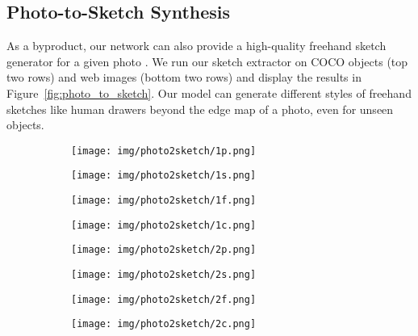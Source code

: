 \documentclass[10pt,twocolumn,letterpaper]{article}
\begin{document}
\subsection{Photo-to-Sketch Synthesis}
\label{sec:p2s_syn}
As a byproduct, our network can also provide a high-quality freehand sketch generator  for a given photo \cite{pang2018deep,yi2019apdrawinggan,kampelmuhler2020synthesizing}. We run our sketch extractor on COCO objects (top two rows) and web images (bottom two rows) and display the results in Figure~\ref{fig:photo_to_sketch}. Our model can generate different styles of freehand sketches like human drawers beyond the edge map of a photo, even for unseen objects.

\newcommand{\ptswidth}{0.22} 
\begin{figure}[tbp]
\captionsetup[subfigure]{labelformat=empty}
\begin{center}
  \begin{subfigure}[b]{\ptswidth\linewidth}
  \texttt{[image: img/photo2sketch/1p.png]}
  \end{subfigure}
  \begin{subfigure}[b]{\ptswidth\linewidth}
  \texttt{[image: img/photo2sketch/1s.png]}
  \end{subfigure}
\begin{subfigure}[b]{\ptswidth\linewidth}
  \texttt{[image: img/photo2sketch/1f.png]}
  \end{subfigure}
  \begin{subfigure}[b]{\ptswidth\linewidth}
  \texttt{[image: img/photo2sketch/1c.png]}
  \end{subfigure}
  
  \begin{subfigure}[b]{\ptswidth\linewidth}
  \texttt{[image: img/photo2sketch/2p.png]}
  \end{subfigure}
  \begin{subfigure}[b]{\ptswidth\linewidth}
  \texttt{[image: img/photo2sketch/2s.png]}
  \end{subfigure}
\begin{subfigure}[b]{\ptswidth\linewidth}
  \texttt{[image: img/photo2sketch/2f.png]}
  \end{subfigure}
  \begin{subfigure}[b]{\ptswidth\linewidth}
  \texttt{[image: img/photo2sketch/2c.png]}
  \end{subfigure}
  

\end{center}
\end{figure}
\end{document}
